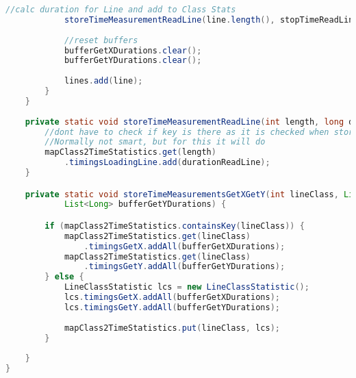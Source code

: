 \begin{lstlisting}[language=java,
    label=lst:analysisrunner,
    caption=Starter class for analysis with main()
]
			//calc duration for Line and add to Class Stats
			storeTimeMeasurementReadLine(line.length(), stopTimeReadLine-startTimeReadLine);
			
			//reset buffers
			bufferGetXDurations.clear();
			bufferGetYDurations.clear();
			
			lines.add(line);
		}
	}
	
	private static void storeTimeMeasurementReadLine(int length, long durationReadLine) {
		//dont have to check if key is there as it is checked when storing getX and getY which is called first
		//Normally not smart, but for this it will do
        mapClass2TimeStatistics.get(length)
            .timingsLoadingLine.add(durationReadLine);
	}

	private static void storeTimeMeasurementsGetXGetY(int lineClass, List<Long> bufferGetXDurations,
			List<Long> bufferGetYDurations) {

		if (mapClass2TimeStatistics.containsKey(lineClass)) {
            mapClass2TimeStatistics.get(lineClass)
                .timingsGetX.addAll(bufferGetXDurations);
            mapClass2TimeStatistics.get(lineClass)
                .timingsGetY.addAll(bufferGetYDurations);
		} else {
			LineClassStatistic lcs = new LineClassStatistic();
			lcs.timingsGetX.addAll(bufferGetXDurations);
			lcs.timingsGetY.addAll(bufferGetYDurations);
			
			mapClass2TimeStatistics.put(lineClass, lcs);
		}
		
	}
}
\end{lstlisting}